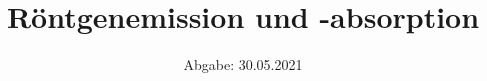 

\subject{V602}
\title{Röntgenemission und -absorption}
\date{%
   Abgabe: 30.05.2021
}



\maketitle
\thispagestyle{empty}
\tableofcontents
\newpage






\printbibliography{}


